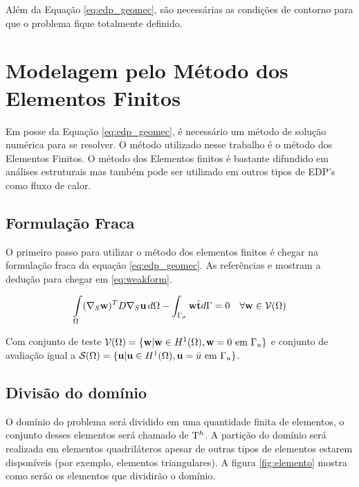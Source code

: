 Além da Equação \eqref{eq:edp_geomec}, são necessárias as condições de contorno para que o problema fique totalmente definido. 

\section{Modelagem pelo Método dos Elementos Finitos}

Em posse da Equação \eqref{eq:edp_geomec}, é necessário um método de solução numérica para se resolver. O método utilizado nesse trabalho é o método dos Elementos Finitos. O método dos Elementos finitos é bastante difundido em análises estruturais mas também pode ser utilizado em outros tipos de EDP's como fluxo de calor. 



\subsection{Formulação Fraca}

O primeiro passo para utilizar o método dos elementos finitos é chegar na formulação fraca da equação \eqref{eq:edp_geomec}. As referências \cite{jacob} e \cite{hughes} mostram a dedução para chegar em  \eqref{eq:weakform}.

\begin{equation}\label{eq:weakform}
\int\limits_{\Omega}  (\nabla_S \mathbf{w})^T D \nabla_S  \mathbf{u} \, d\Omega - \int_{\Gamma_\sigma} \mathbf{w} \bar{\mathbf{t}} d\Gamma = 0 \quad \forall \mathbf{w} \in \mathcal{V}(\Omega) 
\end{equation}


Com conjunto de teste $\mathcal{V}(\Omega) = \{ \mathbf{w} | \mathbf{w} \in H^1(\Omega) , \mathbf{w} = 0 \text{ em } \Gamma_u \}$ e conjunto de avaliação igual a $\mathcal{S}(\Omega) = \{ \mathbf{u} | \mathbf{u} \in H^1(\Omega) , \mathbf{u} = \bar{u} \text{ em } \Gamma_u \}$.




\subsection{Divisão do domínio}

O domínio do problema será dividido em uma quantidade finita de elementos, o conjunto desses elementos será chamado de $\mathrm{T}^h$.  A partição do domínio será realizada em elementos quadriláteros apesar de outras tipos de elementos estarem disponíveis (por exemplo, elementos triangulares). A figura \ref{fig:elemento} mostra como serão os elementos que dividirão o domínio.

